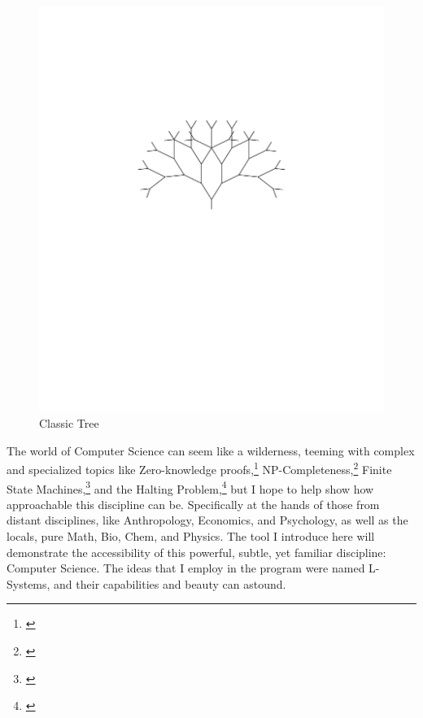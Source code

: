 \documentclass[12pt,twoside]{reedthesis}
\begin{document}
	\begin{figure}[h]
	\centering
	\includegraphics[clip=true, viewport=2.5in 5.5in 7.5in 8.5in, scale=1]{Images/Introduction1} %
	\caption[Classic Tree]{Classic Tree\footnotemark}
	\label {Introduction1}
	\end{figure}


The world of Computer Science can seem like a wilderness, teeming with complex and specialized topics like Zero-knowledge proofs,\footnote{\cite{ZeroKnowledge1989}} NP-Completeness,\footnote{\cite{PvsNP1971}}  Finite State Machines,\footnote{\cite{FSMs2018}}  and the Halting Problem,\footnote{\cite{turing1936}}  but I hope to help show how approachable this discipline can be. Specifically at the hands of those from distant disciplines, like Anthropology, Economics, and Psychology, as well as the locals, pure Math, Bio, Chem, and Physics. The tool I introduce here will demonstrate the accessibility of this powerful, subtle, yet familiar discipline: Computer Science. The ideas that I employ in the program were named L-Systems, and their capabilities and beauty can astound.
	
\end{document}
